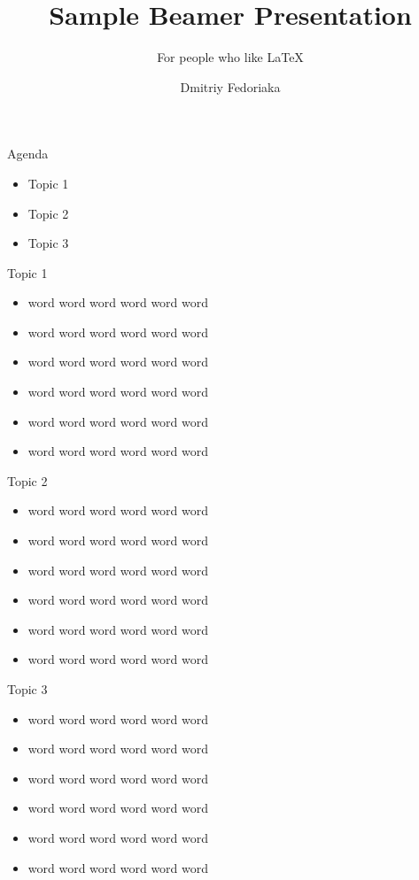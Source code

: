 \documentclass{beamer}
\title{Sample Beamer Presentation}
\subtitle{For people who like \LaTeX}
\institute{Moscow Institute of Physics and Technology}
\author{Dmitriy Fedoriaka}
\begin{document}
\begin{frame}
\titlepage
\end{frame}
\begin{frame}{Agenda}
	\begin{itemize}
		\item Topic 1
		\item Topic 2
		\item Topic 3
  \end{itemize} 
\end{frame}
\begin{frame}{Topic 1}
  \begin{itemize}
		\item word word word word word word
		\item word word word word word word
		\item word word word word word word
		\item word word word word word word
		\item word word word word word word
		\item word word word word word word
	\end{itemize} 
\end{frame}
\begin{frame}{Topic 2}
  \begin{itemize}
		\item word word word word word word
		\item word word word word word word
		\item word word word word word word
		\item word word word word word word
		\item word word word word word word
		\item word word word word word word
	\end{itemize} 
\end{frame}
\begin{frame}{Topic 3}
  \begin{itemize}
		\item word word word word word word
		\item word word word word word word
		\item word word word word word word
		\item word word word word word word
		\item word word word word word word
		\item word word word word word word
	\end{itemize} 
\end{frame}
\end{document}
